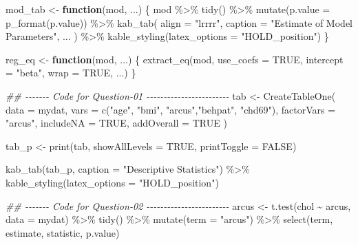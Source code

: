 \documentclass[
  12pt,
  oneside]{article}
\newenvironment{Shaded}{}{}
\newcommand{\AttributeTok}[1]{\textcolor[rgb]{0.49,0.56,0.16}{#1}}
\newcommand{\ConstantTok}[1]{\textcolor[rgb]{0.53,0.00,0.00}{#1}}
\newcommand{\ControlFlowTok}[1]{\textcolor[rgb]{0.00,0.44,0.13}{\textbf{#1}}}
\newcommand{\DocumentationTok}[1]{\textcolor[rgb]{0.73,0.13,0.13}{\textit{#1}}}
\newcommand{\FunctionTok}[1]{\textcolor[rgb]{0.02,0.16,0.49}{#1}}
\newcommand{\NormalTok}[1]{#1}
\newcommand{\OtherTok}[1]{\textcolor[rgb]{0.00,0.44,0.13}{#1}}
\newcommand{\SpecialCharTok}[1]{\textcolor[rgb]{0.25,0.44,0.63}{#1}}
\newcommand{\StringTok}[1]{\textcolor[rgb]{0.25,0.44,0.63}{#1}}
\begin{document}
\begin{Shaded}
\begin{Highlighting}[]
\NormalTok{mod\_tab }\OtherTok{\textless{}{-}} \ControlFlowTok{function}\NormalTok{(mod, ...) \{}
\NormalTok{  mod }\SpecialCharTok{\%\textgreater{}\%} \FunctionTok{tidy}\NormalTok{() }\SpecialCharTok{\%\textgreater{}\%} 
    \FunctionTok{mutate}\NormalTok{(}\AttributeTok{p.value =} \FunctionTok{p\_format}\NormalTok{(p.value)) }\SpecialCharTok{\%\textgreater{}\%} 
    \FunctionTok{kab\_tab}\NormalTok{(}
      \AttributeTok{align =} \StringTok{"lrrrr"}\NormalTok{,}
      \AttributeTok{caption =} \StringTok{"Estimate of Model Parameters"}\NormalTok{, ...}
\NormalTok{    ) }\SpecialCharTok{\%\textgreater{}\%} 
    \FunctionTok{kable\_styling}\NormalTok{(}\AttributeTok{latex\_options =} \StringTok{"HOLD\_position"}\NormalTok{)}
\NormalTok{\}}

\NormalTok{reg\_eq }\OtherTok{\textless{}{-}} \ControlFlowTok{function}\NormalTok{(mod, ...) \{}
  \FunctionTok{extract\_eq}\NormalTok{(mod, }\AttributeTok{use\_coefs =} \ConstantTok{TRUE}\NormalTok{, }\AttributeTok{intercept =} \StringTok{"beta"}\NormalTok{, }\AttributeTok{wrap =} \ConstantTok{TRUE}\NormalTok{, ...)}
\NormalTok{\}}



\DocumentationTok{\#\# {-}{-}{-}{-}{-}{-}{-} Code for Question{-}01 {-}{-}{-}{-}{-}{-}{-}{-}{-}{-}{-}{-}{-}{-}{-}{-}{-}{-}{-}{-}{-}{-}{-}{-}}
\NormalTok{tab }\OtherTok{\textless{}{-}} \FunctionTok{CreateTableOne}\NormalTok{(}
    \AttributeTok{data =}\NormalTok{ mydat,}
    \AttributeTok{vars =} \FunctionTok{c}\NormalTok{(}\StringTok{"age"}\NormalTok{, }\StringTok{"bmi"}\NormalTok{, }\StringTok{"arcus"}\NormalTok{,}\StringTok{"behpat"}\NormalTok{, }\StringTok{"chd69"}\NormalTok{),}
    \AttributeTok{factorVars =} \StringTok{"arcus"}\NormalTok{,}
    \AttributeTok{includeNA =} \ConstantTok{TRUE}\NormalTok{,}
    \AttributeTok{addOverall =} \ConstantTok{TRUE}
\NormalTok{  )}

\NormalTok{tab\_p }\OtherTok{\textless{}{-}} \FunctionTok{print}\NormalTok{(tab, }\AttributeTok{showAllLevels =} \ConstantTok{TRUE}\NormalTok{, }\AttributeTok{printToggle =} \ConstantTok{FALSE}\NormalTok{)}

\FunctionTok{kab\_tab}\NormalTok{(tab\_p, }\AttributeTok{caption =} \StringTok{"Descriptive Statistics"}\NormalTok{) }\SpecialCharTok{\%\textgreater{}\%} 
  \FunctionTok{kable\_styling}\NormalTok{(}\AttributeTok{latex\_options =} \StringTok{"HOLD\_position"}\NormalTok{)}
  

\DocumentationTok{\#\# {-}{-}{-}{-}{-}{-}{-} Code for Question{-}02 {-}{-}{-}{-}{-}{-}{-}{-}{-}{-}{-}{-}{-}{-}{-}{-}{-}{-}{-}{-}{-}{-}{-}{-}}
\NormalTok{arcus }\OtherTok{\textless{}{-}} \FunctionTok{t.test}\NormalTok{(chol }\SpecialCharTok{\textasciitilde{}}\NormalTok{ arcus, }\AttributeTok{data =}\NormalTok{ mydat) }\SpecialCharTok{\%\textgreater{}\%}
  \FunctionTok{tidy}\NormalTok{() }\SpecialCharTok{\%\textgreater{}\%}
  \FunctionTok{mutate}\NormalTok{(}\AttributeTok{term =} \StringTok{"arcus"}\NormalTok{) }\SpecialCharTok{\%\textgreater{}\%}
  \FunctionTok{select}\NormalTok{(term, estimate, statistic, p.value)}


\end{Highlighting}
\end{Shaded}
\end{document}
